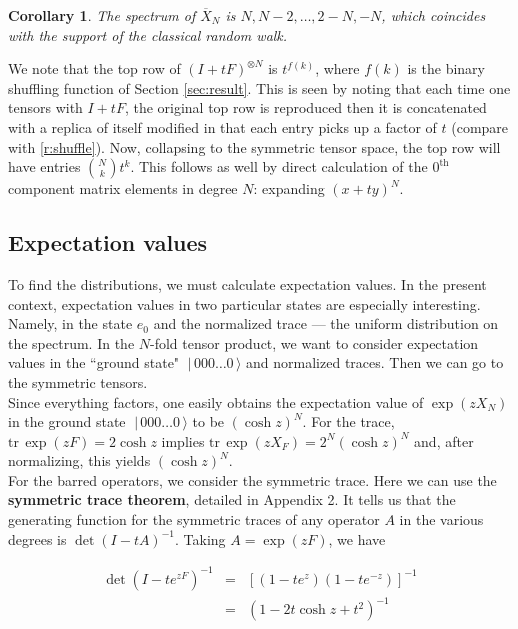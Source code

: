 \documentclass[12pt]{article}    %
\newtheorem{corollary}[thm]{Corollary}
\def\dir#1.{\;|\, #1 \,\rangle}             %
\def\tr{\mathrm{tr}\,}
\begin{document}
\begin{corollary}
The spectrum of $\overline{X}_N$ is
$N,N-2,\ldots,2-N,-N$, which coincides with the support 
of the classical random walk.
\end{corollary}


We note that the top row of $(I+tF)^{\otimes N}$ is $t^{f(k)}$, where
$f(k)$ is the binary shuffling function of Section \ref{sec:result}. 
This is seen by noting that each time one tensors with $I+tF$, 
the original top row is reproduced then it is concatenated with a replica 
of itself modified in that each entry picks up a factor of $t$ 
(compare with \ref{r:shuffle}).
Now, collapsing to the symmetric tensor space,
the top row will have entries ${N\choose k}t^k$. This
follows as well by direct calculation of the $0^{\mathrm{th}}$ component
matrix elements in degree $N$: expanding $(x+ty)^N$.



\subsection{Expectation values}
To find the distributions, we must calculate expectation values. In
the present context, expectation values in
two particular states are especially interesting. Namely,
in the state $e_0$ and the normalized trace --- the uniform distribution
on the spectrum. In the $N$-fold tensor product, we want to consider
expectation values in the ``ground state" $\dir 000\ldots0.$ 
and normalized traces. Then we can go to the symmetric tensors.
\\

Since everything factors, 
one easily obtains the expectation value of $\exp(zX_N)$ 
in the ground state $\dir 000\ldots0.$ to be $(\cosh z)^N$. 
For the trace, $\tr \exp(zF)=2\cosh z$ implies
$\tr\exp(zX_F)=2^N(\cosh z)^N$ and, after normalizing, this yields
$(\cosh z)^N$.
\\

For the barred operators, we consider the symmetric trace. Here we can use
the {\bf symmetric trace theorem}, detailed in Appendix 2. It tells us
that the generating function for the symmetric traces of any operator
$A$ in the various degrees is $\det(I-tA)^{-1}$. Taking
$A=\exp(zF)$, we have

\begin{eqnarray*}
  \det(I-te^{zF})^{-1} &=& [(1-te^z)(1-te^{-z})]^{-1}\\
                       &=& (1-2t\cosh z+t^2)^{-1}
\end{eqnarray*}
\end{document}
